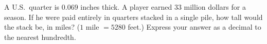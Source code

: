 A U.S.\ quarter is $0.069$ inches thick. A player earned $33$ million dollars for a season. If he were paid entirely in quarters stacked in a single pile, how tall would the stack be, in miles? ($1$ mile $=5280$ feet.) Express your answer as a decimal to the nearest hundredth.
